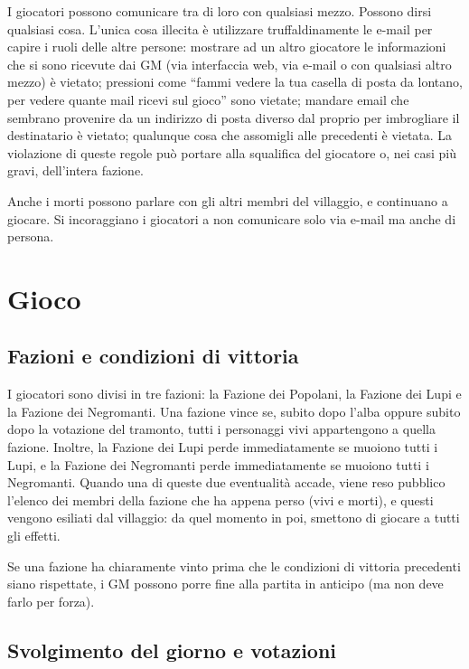 \documentclass[a4paper,10pt]{article}
\begin{document}
I giocatori possono comunicare tra di loro con qualsiasi mezzo. Possono dirsi qualsiasi cosa.
L'unica cosa illecita è utilizzare truffaldinamente le e-mail per capire i ruoli delle altre persone: mostrare ad un altro giocatore le informazioni che si sono ricevute dai GM (via interfaccia web, via e-mail o con qualsiasi altro mezzo) è vietato; pressioni come ``fammi vedere la tua casella di posta da lontano, per vedere quante mail ricevi sul gioco'' sono vietate; mandare email che sembrano provenire da un indirizzo di posta diverso dal proprio per imbrogliare il destinatario è vietato; qualunque cosa che assomigli alle precedenti è vietata. La violazione di queste regole può portare alla squalifica del giocatore o, nei casi più gravi, dell'intera fazione.

Anche i morti possono parlare con gli altri membri del villaggio, e continuano a giocare. Si incoraggiano i giocatori a non comunicare solo via e-mail ma anche di persona.


\pagebreak
\section{Gioco}


\subsection{Fazioni e condizioni di vittoria}

I giocatori sono divisi in tre fazioni: la Fazione dei Popolani, la Fazione dei Lupi e la Fazione dei Negromanti.
Una fazione vince se, subito dopo l'alba oppure subito dopo la votazione del tramonto, tutti i personaggi vivi appartengono a quella fazione.
Inoltre, la Fazione dei Lupi perde immediatamente se muoiono tutti i Lupi, e la Fazione dei Negromanti perde immediatamente se muoiono tutti i Negromanti. Quando una di queste due eventualità accade, viene reso pubblico l'elenco dei membri della fazione che ha appena perso (vivi e morti), e questi vengono esiliati dal villaggio: da quel momento in poi, smettono di giocare a tutti gli effetti.

Se una fazione ha chiaramente vinto prima che le condizioni di vittoria precedenti siano rispettate, i GM possono porre fine alla partita in anticipo (ma non deve farlo per forza).



\subsection{Svolgimento del giorno e votazioni}
\end{document}
